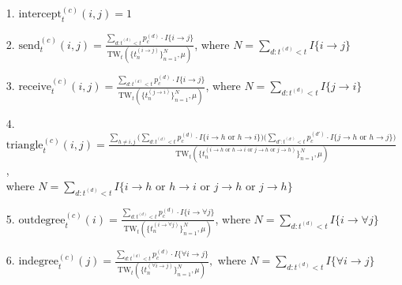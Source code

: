 \documentclass[a4paper]{article}
\begin{document}
 \begin{itemize}[leftmargin=*,rightmargin=-1cm]
 	\item [1.] $\mbox{intercept}^{(c)}_t(i, j) = 1$
 	\item [2.]  $\mbox{send}^{(c)}_t(i, j)= \frac{\sum\limits_{d: t^{(d)}<t}p_c^{(d)}\cdot I\{i\rightarrow j\}}{\mbox{TW}_t(\{t_n^{(i\rightarrow j)}\}_{n=1}^N, \mu) }$, where $N = \sum\limits_{d: t^{(d)}<t} I\{i\rightarrow j\}$
 	\item [3.] $\mbox{receive}^{(c)}_t(i, j)=\frac{\sum\limits_{d: t^{(d)}<t}p_c^{(d)}\cdot I\{i\rightarrow j\}}{\mbox{TW}_t(\{t_n^{(j\rightarrow i)}\}_{n=1}^N, \mu) }$, where $N = \sum\limits_{d: t^{(d)}<t} I\{j\rightarrow i\}$
 	\item [4.] $\mbox{triangle}^{(c)}_t(i, j)=\frac{\sum\limits_{h \neq i, j}\Big(\sum\limits_{d: t^{(d)}<t}p_c^{(d)}\cdot I\{i\rightarrow h \mbox{ or } h\rightarrow i\}\Big)\Big(\sum\limits_{d': t^{(d')}<t}p_c^{(d')}\cdot I\{j\rightarrow h \mbox{ or } h\rightarrow j\}\Big)}{\mbox{TW}_t(\{t_n^{(i\rightarrow h \mbox{ or } h\rightarrow i \mbox{ or } j\rightarrow h \mbox{ or } j\rightarrow h)}\}_{n=1}^N, \mu) }$, \\where $N = \sum\limits_{d: t^{(d)}<t} I\{i\rightarrow h \mbox{ or } h\rightarrow i \mbox{ or } j\rightarrow h \mbox{ or } j\rightarrow h\}$
 	\item [5.]  $\mbox{outdegree}^{(c)}_t(i)=\frac{\sum\limits_{d: t^{(d)}<t}p_c^{(d)}\cdot I\{i\rightarrow \forall j\}}{\mbox{TW}_t(\{t_n^{(i\rightarrow \forall j)}\}_{n=1}^N, \mu) }$, where $N = \sum\limits_{d: t^{(d)}<t} I\{i\rightarrow \forall j\}$
 	\item [6.] $\mbox{indegree}^{(c)}_t(j)=\frac{\sum\limits_{d: t^{(d)}<t}p_c^{(d)}\cdot I\{\forall i\rightarrow j\}}{\mbox{TW}_t(\{t_n^{(\forall i\rightarrow  j)}\}_{n=1}^N, \mu)}, $ where $N = \sum\limits_{d: t^{(d)}<t} I\{\forall i\rightarrow j\}$
 \end{itemize}
\end{document}

